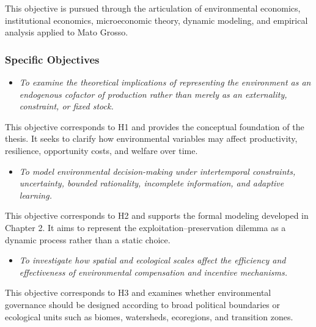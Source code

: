 This objective is pursued through the articulation of environmental economics, institutional economics, microeconomic theory, dynamic modeling, and empirical analysis applied to Mato Grosso.

\subsubsection{Specific Objectives}

\begin{itemize}

    \item[\textbf{G1.}]
    
    \textit{To examine the theoretical implications of representing the environment as an endogenous cofactor of production rather than merely as an externality, constraint, or fixed stock.}

\end{itemize}

This objective corresponds to H1 and provides the conceptual foundation of the thesis. It seeks to clarify how environmental variables may affect productivity, resilience, opportunity costs, and welfare over time.

\begin{itemize}

    \item[\textbf{G2.}]
    
    \textit{To model environmental decision-making under intertemporal constraints, uncertainty, bounded rationality, incomplete information, and adaptive learning.}

\end{itemize}

This objective corresponds to H2 and supports the formal modeling developed in Chapter 2. It aims to represent the exploitation--preservation dilemma as a dynamic process rather than a static choice.

\begin{itemize}

    \item[\textbf{G3.}]
    
    \textit{To investigate how spatial and ecological scales affect the efficiency and effectiveness of environmental compensation and incentive mechanisms.}

\end{itemize}

This objective corresponds to H3 and examines whether environmental governance should be designed according to broad political boundaries or ecological units such as biomes, watersheds, ecoregions, and transition zones.

